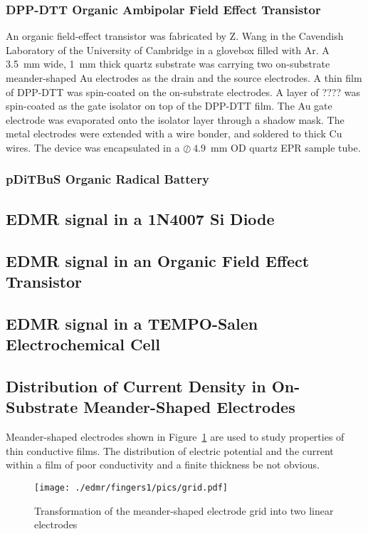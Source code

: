 \subsubsection{DPP-DTT Organic Ambipolar Field Effect Transistor}
An organic field-effect transistor was fabricated by Z. Wang in the Cavendish Laboratory of the University of Cambridge in a glovebox filled with Ar. A 3.5~mm wide, 1~mm thick quartz substrate was carrying two on-substrate meander-shaped Au electrodes as the drain and the source electrodes. A thin film of DPP-DTT was spin-coated on the on-substrate electrodes. A layer of ???? was spin-coated as the gate isolator on top of the DPP-DTT film. The Au gate electrode was evaporated onto the isolator layer through a shadow mask. The metal electrodes were extended with a wire bonder, and soldered to thick Cu wires. The device was encapsulated in a $\oslash~4.9$~mm OD quartz EPR sample tube.

\subsubsection{pDiTBuS Organic Radical Battery}


\subsection{EDMR signal in a 1N4007 Si Diode}




\subsection{EDMR signal in an Organic Field Effect Transistor}

\subsection{EDMR signal in a TEMPO-Salen Electrochemical Cell}


\subsection{Distribution of Current Density in On-Substrate Meander-Shaped Electrodes}
Meander-shaped electrodes shown in Figure~\ref{fig:grid} are used to study properties of thin conductive films. The distribution of electric potential and the current within a film of poor conductivity and a finite thickness be not obvious. 

\begin{figure} [!ht]
\begin{center}
       \texttt{[image: ./edmr/fingers1/pics/grid.pdf]}
       \end{center}
\caption{Transformation of the meander-shaped electrode grid into two linear electrodes}
     \label{fig:grid}
\end{figure}

